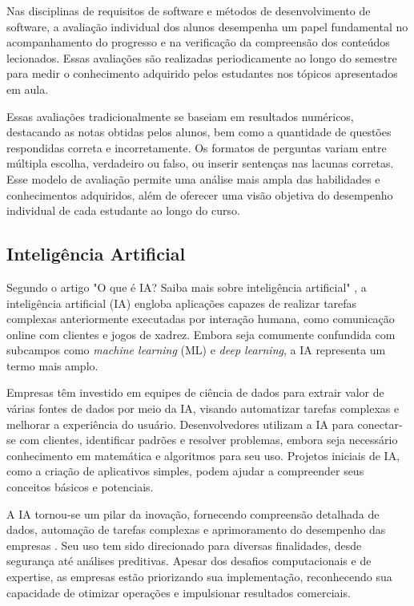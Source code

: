 Nas disciplinas de requisitos de software e métodos de desenvolvimento de software, a avaliação individual dos alunos desempenha um papel fundamental no acompanhamento do progresso e na verificação da compreensão dos conteúdos lecionados. Essas avaliações são realizadas periodicamente ao longo do semestre para medir o conhecimento adquirido pelos estudantes nos tópicos apresentados em aula.

Essas avaliações tradicionalmente se baseiam em resultados numéricos, destacando as notas obtidas pelos alunos, bem como a quantidade de questões respondidas correta e incorretamente. Os formatos de perguntas variam entre múltipla escolha, verdadeiro ou falso, ou inserir sentenças nas lacunas corretas. Esse modelo de avaliação permite uma análise mais ampla das habilidades e conhecimentos adquiridos, além de oferecer uma visão objetiva do desempenho individual de cada estudante ao longo do curso.

\subsection{Inteligência Artificial}

Segundo o artigo "O que é IA? Saiba mais sobre inteligência artificial" \cite{oracleia2023}, a inteligência artificial (IA) engloba aplicações capazes de realizar tarefas complexas anteriormente executadas por interação humana, como comunicação online com clientes e jogos de xadrez. Embora seja comumente confundida com subcampos como \textit{machine learning} (ML) e \textit{deep learning}, a IA representa um termo mais amplo.

Empresas têm investido em equipes de ciência de dados para extrair valor de várias fontes de dados por meio da IA, visando automatizar tarefas complexas e melhorar a experiência do usuário. Desenvolvedores utilizam a IA para conectar-se com clientes, identificar padrões e resolver problemas, embora seja necessário conhecimento em matemática e algoritmos para seu uso. Projetos iniciais de IA, como a criação de aplicativos simples, podem ajudar a compreender seus conceitos básicos e potenciais.

A IA tornou-se um pilar da inovação, fornecendo compreensão detalhada de dados, automação de tarefas complexas e aprimoramento do desempenho das empresas \cite{oracleia2023}. Seu uso tem sido direcionado para diversas finalidades, desde segurança até análises preditivas. Apesar dos desafios computacionais e de expertise, as empresas estão priorizando sua implementação, reconhecendo sua capacidade de otimizar operações e impulsionar resultados comerciais.

